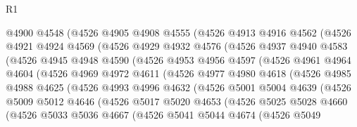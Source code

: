 \begin{lexlean}{R1}
\begin{coremodule}
          @4900
          @4548
          (@4526
            @4905
            @4908
            @4555
            (@4526
              @4913
              @4916
              @4562
              (@4526
                @4921
                @4924
                @4569
                (@4526
                  @4929
                  @4932
                  @4576
                  (@4526
                    @4937
                    @4940
                    @4583
                    (@4526
                      @4945
                      @4948
                      @4590
                      (@4526
                        @4953
                        @4956
                        @4597
                        (@4526
                          @4961
                          @4964
                          @4604
                          (@4526
                            @4969
                            @4972
                            @4611
                            (@4526
                              @4977
                              @4980
                              @4618
                              (@4526
                                @4985
                                @4988
                                @4625
                                (@4526
                                  @4993
                                  @4996
                                  @4632
                                  (@4526
                                    @5001
                                    @5004
                                    @4639
                                    (@4526
                                      @5009
                                      @5012
                                      @4646
                                      (@4526
                                        @5017
                                        @5020
                                        @4653
                                        (@4526
                                          @5025
                                          @5028
                                          @4660
                                          (@4526
                                            @5033
                                            @5036
                                            @4667
                                            (@4526
                                              @5041
                                              @5044
                                              @4674
                                              (@4526
                                                @5049

\end{coremodule}
\end{lexlean}
